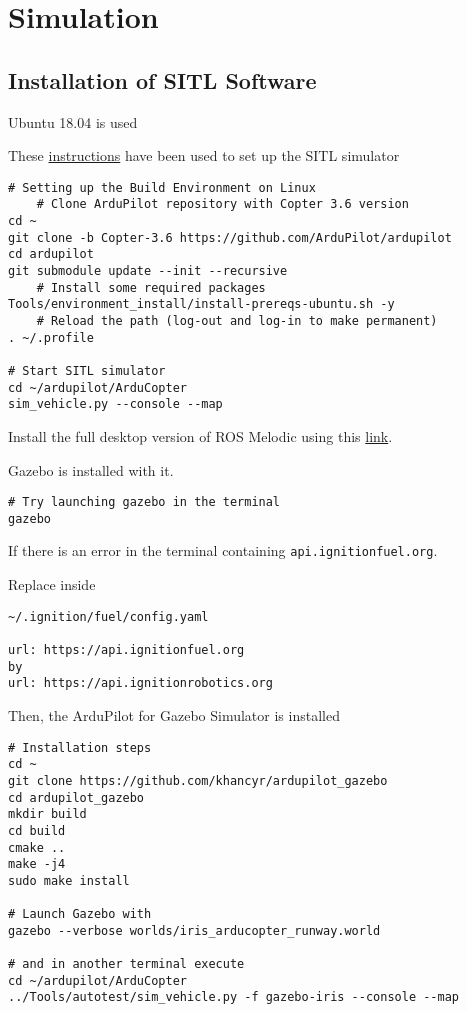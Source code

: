 \section{Simulation}

\subsection{Installation of SITL Software}
Ubuntu 18.04 is used

These \href{http://ardupilot.org/dev/docs/setting-up-sitl-on-linux.html}{instructions} have been used to set up the SITL simulator

\begin{verbatim}
# Setting up the Build Environment on Linux
    # Clone ArduPilot repository with Copter 3.6 version
cd ~
git clone -b Copter-3.6 https://github.com/ArduPilot/ardupilot
cd ardupilot
git submodule update --init --recursive
    # Install some required packages
Tools/environment_install/install-prereqs-ubuntu.sh -y
    # Reload the path (log-out and log-in to make permanent)
. ~/.profile

# Start SITL simulator
cd ~/ardupilot/ArduCopter
sim_vehicle.py --console --map
            \end{verbatim}

Install the full desktop version of ROS Melodic using this \href{http://wiki.ros.org/melodic/Installation/Ubuntu}{link}.

Gazebo is installed with it.

\begin{verbatim}
# Try launching gazebo in the terminal
gazebo
            \end{verbatim}

If there is an error in the terminal containing \texttt{api.ignitionfuel.org}.

Replace inside
\begin{verbatim}
~/.ignition/fuel/config.yaml

url: https://api.ignitionfuel.org
by
url: https://api.ignitionrobotics.org
            \end{verbatim}

Then, the ArduPilot for Gazebo Simulator is installed
\begin{verbatim}
# Installation steps
cd ~
git clone https://github.com/khancyr/ardupilot_gazebo
cd ardupilot_gazebo
mkdir build
cd build
cmake ..
make -j4
sudo make install

# Launch Gazebo with
gazebo --verbose worlds/iris_arducopter_runway.world

# and in another terminal execute
cd ~/ardupilot/ArduCopter
../Tools/autotest/sim_vehicle.py -f gazebo-iris --console --map
            \end{verbatim}

